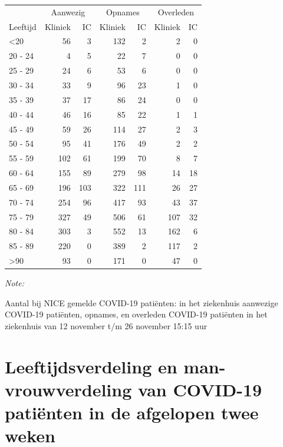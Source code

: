 \documentclass[
  english,
  man,floatsintext]{apa6}
\begin{document}
\begin{table}
\centering\begingroup\fontsize{10}{12}\selectfont

\begin{threeparttable}
\begin{tabular}{lrrrrrr}
\toprule
\multicolumn{1}{c}{ } & \multicolumn{2}{c}{Aanwezig} & \multicolumn{2}{c}{Opnames} & \multicolumn{2}{c}{Overleden} \\
\cmidrule(l{3pt}r{3pt}){2-3} \cmidrule(l{3pt}r{3pt}){4-5} \cmidrule(l{3pt}r{3pt}){6-7}
Leeftijd & Kliniek & IC & Kliniek & IC & Kliniek & IC\\
\midrule
<20 & 56 & 3 & 132 & 2 & 2 & 0\\
20 - 24 & 4 & 5 & 22 & 7 & 0 & 0\\
25 - 29 & 24 & 6 & 53 & 6 & 0 & 0\\
30 - 34 & 33 & 9 & 96 & 23 & 1 & 0\\
35 - 39 & 37 & 17 & 86 & 24 & 0 & 0\\
40 - 44 & 46 & 16 & 85 & 22 & 1 & 1\\
45 - 49 & 59 & 26 & 114 & 27 & 2 & 3\\
50 - 54 & 95 & 41 & 176 & 49 & 2 & 2\\
55 - 59 & 102 & 61 & 199 & 70 & 8 & 7\\
60 - 64 & 155 & 89 & 279 & 98 & 14 & 18\\
65 - 69 & 196 & 103 & 322 & 111 & 26 & 27\\
70 - 74 & 254 & 96 & 417 & 93 & 43 & 37\\
75 - 79 & 327 & 49 & 506 & 61 & 107 & 32\\
80 - 84 & 303 & 3 & 552 & 13 & 162 & 6\\
85 - 89 & 220 & 0 & 389 & 2 & 117 & 2\\
>90 & 93 & 0 & 171 & 0 & 47 & 0\\
\bottomrule
\end{tabular}
\begin{tablenotes}
\item \textit{Note: } 
\item Aantal bij NICE gemelde COVID-19 patiënten: in het ziekenhuis aanwezige COVID-19 patiënten, opnames, en overleden COVID-19 patiënten in het ziekenhuis van 12 november t/m 26 november 15:15 uur
\end{tablenotes}
\end{threeparttable}
\endgroup{}
\end{table}

\newpage

\hypertarget{leeftijdsverdeling-en-man-vrouwverdeling-van-covid-19-patiuxebnten-in-de-afgelopen-twee-weken}{%
\section{Leeftijdsverdeling en man-vrouwverdeling van COVID-19 patiënten in de afgelopen twee weken}\label{leeftijdsverdeling-en-man-vrouwverdeling-van-covid-19-patiuxebnten-in-de-afgelopen-twee-weken}}
\end{document}
